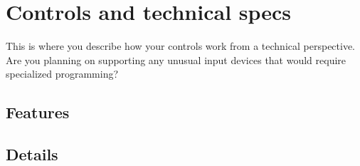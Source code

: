 \section{Controls and technical specs} %
This is where you describe how your controls work from a technical perspective. Are you planning on supporting any unusual input devices that would require specialized programming?
\subsection{Features} %

\subsection{Details} %